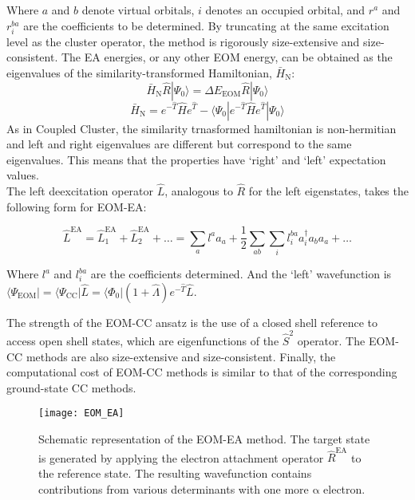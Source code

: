 Where $a$ and $b$ denote virtual orbitals, $i$ denotes an occupied orbital, and $r^a$ and $r^{ba}_{i}$ are the coefficients to be determined. By truncating at the same excitation level as the cluster operator, the method is rigorously size-extensive and size-consistent. The EA energies, or any other EOM energy, can be obtained as the eigenvalues of the similarity-transformed Hamiltonian, $\bar{H}_{\mathrm{N}}$:
\begin{equation}
    \bar{H}_{\mathrm{N}} \hat{R} | \Psi_0 \rangle = \Delta E_{\mathrm{EOM}} \hat{R} | \Psi_0 \rangle
\end{equation}
\begin{equation}
    \bar{H}_{\mathrm{N}} = e^{-\hat{T}} \hat{H} e^{\hat{T}} - \langle \Psi_0 | e^{-\hat{T}} \hat{H} e^{\hat{T}} | \Psi_0 \rangle
\end{equation}
As in Coupled Cluster, the similarity trnasformed hamiltonian is non-hermitian and left and right eigenvalues are different but correspond to the same eigenvalues. This means that the properties have `right' and `left' expectation values. \\
The left deexcitation operator $\hat{L}$, analogous to $\hat{R}$ for the left eigenstates, takes the following form for EOM-EA:

\begin{equation}
\hat{L}^{\mathrm{EA}} = \hat{L}_1^{\mathrm{EA}} + \hat{L}_2^{\mathrm{EA}} + \ldots = \sum_{a} l^a a_a + \frac{1}{2}\sum_{ab} \sum_{i} l^{ba}_{i} a_i^{\dagger} a_b a_a + \ldots
\end{equation}

Where $l^a$ and $l^{ba}_{i}$ are the coefficients determined. And the `left' wavefunction is $\langle\Psi_{\mathrm{EOM}}| = \langle\Psi_{\mathrm{CC}}| \hat{L} = \langle\Phi_0|(1 + \hat{\Lambda})e^{-\hat{T}}\hat{L}$.

The strength of the EOM-CC ansatz is the use of a closed shell reference to access open shell states, which are eigenfunctions of the $\hat{S}^2$ operator. The EOM-CC methods are also size-extensive and size-consistent. Finally, the computational cost of EOM-CC methods is similar to that of the corresponding ground-state CC methods.
\begin{figure}
    \centering
    \medskip
    \texttt{[image: EOM\_EA]}
    \caption[EOM-EA]{Schematic representation of the EOM-EA method. The target state is generated by applying the electron attachment operator $\hat{R}^{\mathrm{EA}}$ to the reference state. The resulting wavefunction contains contributions from various determinants with one more $\mathrm{\alpha}$ electron.}
    \label{fig:EOM}
\end{figure}

